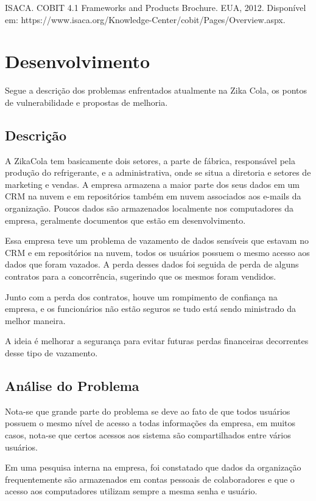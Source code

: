\documentclass[12pt]{article}
\begin{document}
ISACA. COBIT 4.1 Frameworks and Products Brochure. EUA, 2012. Disponível em:
https://www.isaca.org/Knowledge-Center/cobit/Pages/Overview.aspx. 

\section{Desenvolvimento}

Segue a descrição dos problemas enfrentados atualmente na Zika Cola, os pontos de vulnerabilidade e propostas de melhoria.

\subsection{Descrição}

A ZikaCola tem basicamente dois setores, a parte de fábrica, responsável pela produção do refrigerante, e a administrativa, onde se situa a diretoria e setores de marketing e vendas. A empresa armazena a maior parte dos seus dados em um CRM na nuvem e em repositórios também em nuvem associados aos e-mails da organização. Poucos dados são armazenados localmente nos computadores da empresa, geralmente documentos que estão em desenvolvimento.

Essa empresa teve um problema de vazamento de dados sensíveis que estavam no CRM e em repositórios na nuvem, todos os usuários possuem o mesmo acesso aos dados que foram vazados. A perda desses dados foi seguida de perda de alguns contratos para a concorrência, sugerindo que os mesmos foram vendidos.

Junto com a perda dos contratos, houve um rompimento de confiança na empresa, e os funcionários não estão seguros se tudo está sendo ministrado da melhor maneira.

A ideia é melhorar a segurança para evitar futuras perdas financeiras decorrentes desse tipo de vazamento.

\subsection{Análise do Problema}

Nota-se que grande parte do problema se deve ao fato de que todos usuários possuem o mesmo nível de acesso a todas informações da empresa, em muitos casos, nota-se que certos acessos aos sistema são compartilhados entre vários usuários.

Em uma pesquisa interna na empresa, foi constatado que dados da organização frequentemente são armazenados em contas pessoais de colaboradores e que o acesso aos computadores utilizam sempre a mesma senha e usuário.
\end{document}
